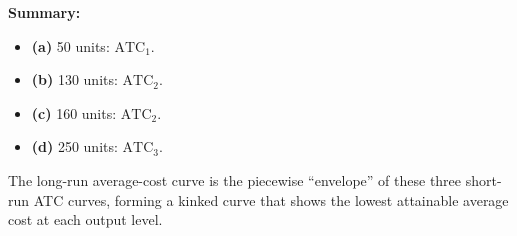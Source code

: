 \documentclass[12pt]{article}
\begin{document}
\medskip
\textbf{Summary:}
\begin{itemize}[noitemsep]
  \item \textbf{(a)} 50 units: \(\text{ATC}_1\).
  \item \textbf{(b)} 130 units: \(\text{ATC}_2\).
  \item \textbf{(c)} 160 units: \(\text{ATC}_2\).
  \item \textbf{(d)} 250 units: \(\text{ATC}_3\).
\end{itemize}
The long-run average-cost curve is the piecewise ``envelope'' of these three short-run ATC curves, forming a kinked curve that shows the lowest attainable average cost at each output level.
\end{document}

